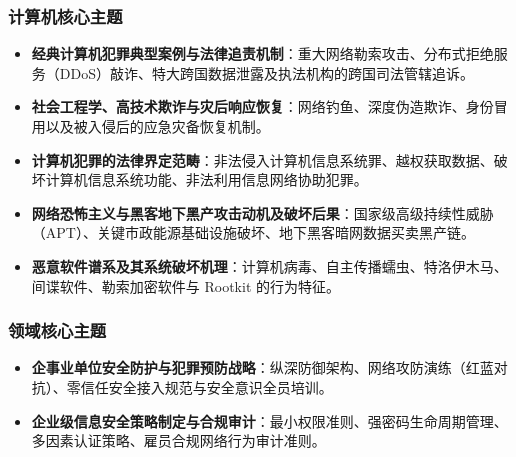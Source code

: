 \subsubsection{计算机核心主题}
\begin{itemize}
    \item \textbf{经典计算机犯罪典型案例与法律追责机制}：重大网络勒索攻击、分布式拒绝服务（DDoS）敲诈、特大跨国数据泄露及执法机构的跨国司法管辖追诉。
    \item \textbf{社会工程学、高技术欺诈与灾后响应恢复}：网络钓鱼、深度伪造欺诈、身份冒用以及被入侵后的应急灾备恢复机制。
    \item \textbf{计算机犯罪的法律界定范畴}：非法侵入计算机信息系统罪、越权获取数据、破坏计算机信息系统功能、非法利用信息网络协助犯罪。
    \item \textbf{网络恐怖主义与黑客地下黑产攻击动机及破坏后果}：国家级高级持续性威胁（APT）、关键市政能源基础设施破坏、地下黑客暗网数据买卖黑产链。
    \item \textbf{恶意软件谱系及其系统破坏机理}：计算机病毒、自主传播蠕虫、特洛伊木马、间谍软件、勒索加密软件与 Rootkit 的行为特征。
\end{itemize}

\subsubsection{领域核心主题}
\begin{itemize}
    \item \textbf{企事业单位安全防护与犯罪预防战略}：纵深防御架构、网络攻防演练（红蓝对抗）、零信任安全接入规范与安全意识全员培训。
    \item \textbf{企业级信息安全策略制定与合规审计}：最小权限准则、强密码生命周期管理、多因素认证策略、雇员合规网络行为审计准则。
\end{itemize}

